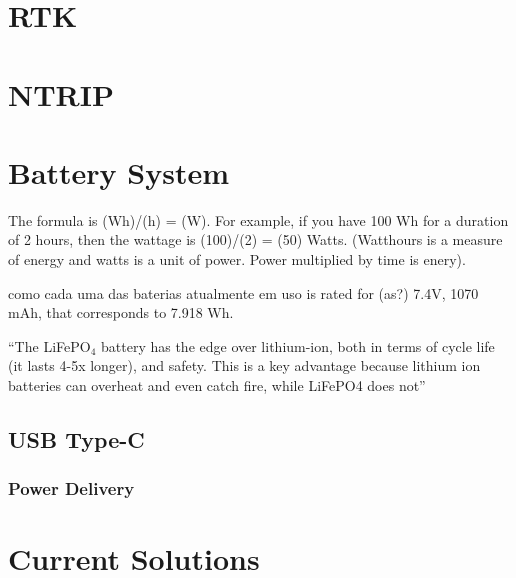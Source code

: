 \section{RTK}\label{II_rtk}

\section{NTRIP}\label{sec:II_ntrip}

\section{Battery System}\label{sec:II_battery}

The formula is (Wh)/(h) = (W). For example, if you have 100 Wh for a duration of 2 hours, then the wattage is (100)/(2) = (50) Watts.
(Watthours is a measure of energy and watts is a unit of power. Power multiplied by time is enery).

como cada uma das baterias atualmente em uso is rated for (as?) 7.4V, 1070 mAh, that corresponds to 7.918 Wh.

``The LiFePO$_4$ battery has the edge over lithium-ion, both in terms of cycle life (it lasts 4-5x longer), and safety. This is a key advantage because lithium ion batteries can overheat and even catch fire, while LiFePO4 does not''%

\subsection{USB Type-C}\label{sec:II_usb_c}
\subsubsection{Power Delivery}\label{sec:II_usb_c_PD}

\section{Current Solutions}\label{sec:II_curr_solutions}


